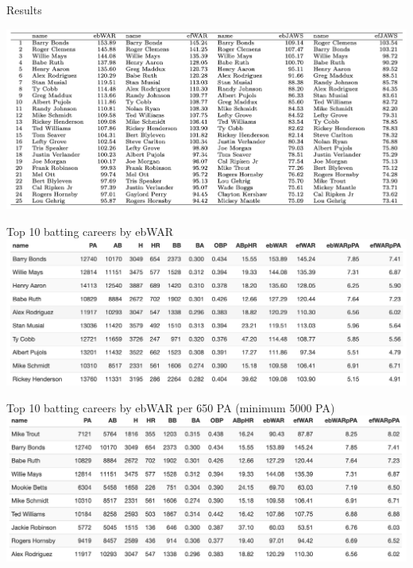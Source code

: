 \documentclass[
  ignorenonframetext,
]{beamer}
\begin{document}
\begin{frame}{}
\protect\hypertarget{section-12}{}
\begin{center}
Results
\end{center}
\end{frame}

\begin{frame}{}
\protect\hypertarget{section-13}{}
\includegraphics{eWAR-eJAWS-rankings.png}
\end{frame}

\begin{frame}{Top 10 batting careers by ebWAR}
\protect\hypertarget{top-10-batting-careers-by-ebwar}{}
\includegraphics{ebWAR_batters.png}
\end{frame}

\begin{frame}{Top 10 batting careers by ebWAR per 650 PA (minimum 5000
PA)}
\protect\hypertarget{top-10-batting-careers-by-ebwar-per-650-pa-minimum-5000-pa}{}
\includegraphics{ebWARpPA_batters.png}
\end{frame}
\end{document}

